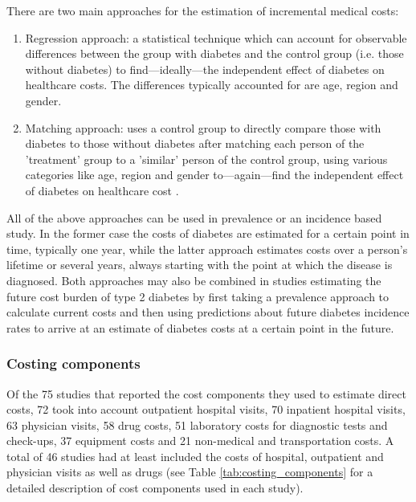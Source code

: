 {{\begin{footnotesize}
\begin{enumerate}
There are two main approaches for the estimation of incremental medical costs:
\begin{enumerate}

\item Regression approach: a statistical technique which can account for observable differences between the group with diabetes and the control group (i.e. those without diabetes) to find---ideally---the independent effect of diabetes on healthcare costs. The differences typically accounted for are age, region and gender.

\item Matching approach: uses a control group to directly compare those with diabetes to those without diabetes after matching each person of the 'treatment' group to a 'similar' person of the control group, using various categories like age, region and gender to---again---find the independent effect of diabetes on healthcare cost \parencite{Akobundu2006}.
\end{enumerate}
\end{enumerate}

All of the above approaches can be used in prevalence or an incidence based study. In the former case the costs of diabetes are estimated for a certain point in time, typically one year, while the latter approach estimates costs over a person's lifetime or several years, always starting with the point at which the disease is diagnosed. Both approaches may also be combined in studies estimating the future cost burden of type 2 diabetes by first taking a prevalence approach to calculate current costs and then using predictions about future diabetes incidence rates to arrive at an estimate of diabetes costs at a certain point in the future.\end{footnotesize}
}}

\subsubsection*{Costing components}
Of the 75 studies that reported the cost components they used to estimate direct costs, 72 took into account outpatient hospital visits, 70 inpatient hospital visits, 63 physician visits, 58 drug costs, 51 laboratory costs for diagnostic tests and check-ups, 37 equipment costs and 21 non-medical and transportation costs. A total of 46 studies had at least included the costs of hospital, outpatient and physician visits as well as drugs (see Table \ref{tab:costing_components} for a detailed description of cost components used in each study).

